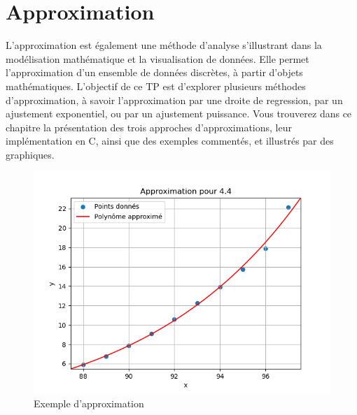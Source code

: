 \chapter{Approximation}
L'approximation est également une méthode d'analyse s'illustrant dans la modélisation mathématique et la visualisation de données. Elle permet l'approximation d'un ensemble de données discrètes, à partir d'objets mathématiques. L'objectif de ce TP est d'explorer plusieurs méthodes d'approximation, à savoir l'approximation par une droite de regression, par un ajustement exponentiel, ou par un ajustement puissance. 
Vous trouverez dans ce chapitre la présentation des trois approches d'approximations, leur implémentation en C, ainsi que des exemples commentés, et illustrés par des graphiques.
\begin{figure}[h]
    \centering
    \includegraphics[width=1\textwidth]{sources/Corentin/approximationC/results/graphs/44.png}
    \caption{Exemple d'approximation}
\end{figure}
\newpage
